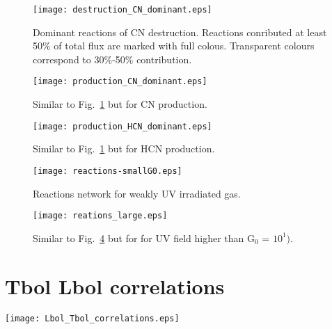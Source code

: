 \documentclass{aa}
\begin{document}
\begin{appendix}
\begin{figure} \texttt{[image: destruction\_CN\_dominant.eps]} \caption{Dominant reactions
of CN destruction. Reactions conributed at least 50$\%$ of total flux are marked with full colous.
Transparent colours correspond to 30$\%$-50$\%$ contribution.} \label{CN_dest} \end{figure}

\begin{figure} 
\texttt{[image: production\_CN\_dominant.eps]} 
\caption{Similar to Fig.~\ref{CN_dest} but for CN production.} 
\label{CN_prod}
\end{figure}

\begin{figure} 
\texttt{[image: production\_HCN\_dominant.eps]} 
\caption{Similar to Fig.~\ref{CN_dest} but for HCN production.} 
\label{HCN_prod} 
\end{figure}

\begin{figure} 
\texttt{[image: reactions-smallG0.eps]} 
\caption{Reactions network for weakly UV irradiated gas.} 
\label{reactions_smallG0} 
\end{figure}

\begin{figure} 
\texttt{[image: reations\_large.eps]} 
\caption{Similar to Fig.~\ref{reactions_smallG0} but for for UV field higher than G$_0$ = $10^{1})$.}
\label{reactions_largeG0} 
\end{figure}


\section{Tbol Lbol correlations} 

\hspace*{-1.5in}
\begin{figure*} 
\texttt{[image: Lbol\_Tbol\_correlations.eps]} 
\caption{}
\label{Tbol_Lbol} 
\end{figure*}


\end{appendix}
\end{document}
